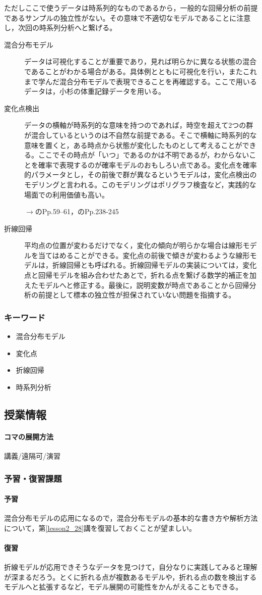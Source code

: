 ただしここで使うデータは時系列的なものであるから，一般的な回帰分析の前提であるサンプルの独立性がない。その意味で不適切なモデルであることに注意し，次回の時系列分析へと繋げる。
\begin{description}
	\item[混合分布モデル] データは可視化することが重要であり，見れば明らかに異なる状態の混合であることがわかる場合がある。具体例とともに可視化を行い，またこれまで学んだ混合分布モデルで表現できることを再確認する。ここで用いるデータは，小杉の体重記録データを用いる。
	\item[変化点検出] データの横軸が時系列的な意味を持つのであれば，時空を超えて2つの群が混合しているというのは不自然な前提である。そこで横軸に時系列的な意味を置くと，ある時点から状態が変化したものとして考えることができる。ここでその時点が「いつ」であるのかは不明であるが，わからないことを確率で表現するのが確率モデルのおもしろい点である。変化点を確率的パラメータとし，その前後で群が異なるというモデルは，変化点検出のモデリングと言われる。このモデリングはポリグラフ検査など，実践的な場面での利用価値も高い。
	      \begin{flushright}
		      $\to$\textcite{Lee201709}のPp.59--61，\textcite{Matsuura201610}のPp.238-245
	      \end{flushright}
	\item[折線回帰] 平均点の位置が変わるだけでなく，変化の傾向が明らかな場合は線形モデルを当てはめることができる。変化点の前後で傾きが変わるような線形モデルは，折線回帰とも呼ばれる。折線回帰モデルの実装については，変化点と回帰モデルを組み合わせたあとで，折れる点を繋げる数学的補正を加えたモデルへと修正する。最後に，説明変数が時点であることから回帰分析の前提として標本の独立性が担保されていない問題を指摘する。
\end{description}
\subsubsection{キーワード}
\begin{itemize}
	\item 混合分布モデル
	\item 変化点
	\item 折線回帰
	\item 時系列分析
\end{itemize}
\subsection{授業情報}
\paragraph{コマの展開方法}
講義/遠隔可/演習
\subsubsection{予習・復習課題}
\paragraph{予習}混合分布モデルの応用になるので，混合分布モデルの基本的な書き方や解析方法について，第\ref{lesson2_28}講を復習しておくことが望ましい。
\paragraph{復習}折線モデルが応用できそうなデータを見つけて，自分なりに実践してみると理解が深まるだろう。とくに折れる点が複数あるモデルや，折れる点の数を検出するモデルへと拡張するなど，モデル展開の可能性をかんがえることもできる。